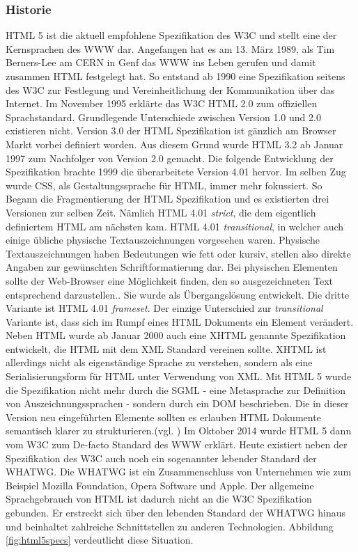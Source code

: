 \subsubsection{Historie} HTML 5 ist die aktuell empfohlene Spezifikation des W3C und stellt eine der Kernsprachen des WWW dar. Angefangen hat es am 13. März 1989, als Tim Berners-Lee am CERN in Genf das WWW ins Leben gerufen und damit zusammen HTML festgelegt hat. So entstand ab 1990 eine Spezifikation seitens des W3C zur Festlegung und Vereinheitlichung der Kommunikation über das Internet. Im November 1995 erklärte das W3C HTML 2.0 zum offiziellen Sprachstandard. Grundlegende Unterschiede zwischen Version 1.0 und 2.0 existieren nicht. Version 3.0 der HTML Spezifikation ist gänzlich am Browser Markt vorbei definiert worden. Aus diesem Grund wurde HTML 3.2 ab Januar 1997 zum Nachfolger von Version 2.0 gemacht. Die folgende Entwicklung der Spezifikation brachte 1999 die überarbeitete Version 4.01 hervor. Im selben Zug wurde CSS, als Gestaltungssprache für HTML, immer mehr fokussiert. So Begann die Fragmentierung der HTML Spezifikation und es existierten drei Versionen zur selben Zeit. Nämlich HTML 4.01 \textit{strict}, die dem eigentlich definiertem HTML am nächsten kam. HTML 4.01 \textit{transitional}, in welcher auch einige übliche physische Textauszeichnungen vorgesehen waren. \glqq Physische Textauszeichnungen haben Bedeutungen wie \glqq fett\grqq{} oder \glqq kursiv\grqq{}, stellen also direkte Angaben zur gewünschten Schriftformatierung dar. Bei physischen Elementen sollte der Web-Browser eine Möglichkeit finden, den so ausgezeichneten Text entsprechend darzustellen.\grqq{}\cite{SelfHTML20141}. Sie wurde als Übergangslösung entwickelt. Die dritte Variante ist HTML 4.01 \textit{frameset}. Der einzige Unterschied zur \textit{transitional} Variante ist, dass sich im Rumpf eines HTML Dokuments ein Element verändert. Neben HTML wurde ab Januar 2000 auch eine XHTML genannte Spezifikation entwickelt, die HTML mit dem XML Standard vereinen sollte. XHTML ist allerdings nicht als eigenständige Sprache zu verstehen, sondern als eine Serialisierungsform für HTML unter Verwendung von XML. Mit HTML 5 wurde die Spezifikation nicht mehr durch die SGML - eine Metasprache zur Definition von Auszeichnungssprachen - sondern durch ein DOM beschrieben. Die in dieser Version neu eingeführten Elemente sollten es erlauben HTML Dokumente semantisch klarer zu strukturieren.(vgl. \cite[S.20ff]{MunzHTML2012}) Im Oktober 2014 wurde HTML 5 dann vom W3C zum De-facto Standard des WWW erklärt. Heute existiert neben der Spezifikation des W3C auch noch ein sogenannter \glqq lebender Standard\grqq{} der WHATWG. Die WHATWG ist ein Zusammenschluss von Unternehmen wie zum Beispiel Mozilla Foundation, Opera Software und Apple. Der allgemeine Sprachgebrauch von HTML ist dadurch nicht an die W3C Spezifikation gebunden. Er erstreckt sich über den \glqq lebenden Standard\grqq{} der WHATWG hinaus und beinhaltet zahlreiche Schnittstellen zu anderen Technologien. Abbildung \ref{fig:html5specs} verdeutlicht diese Situation.
	
